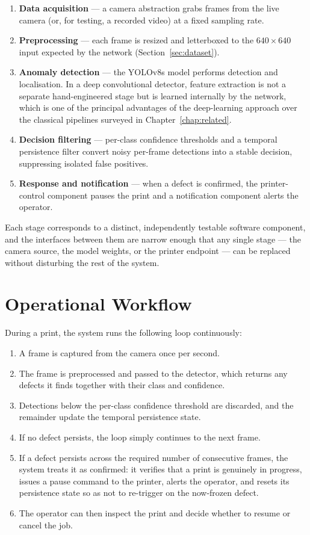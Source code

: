 \documentclass[english, Lau, oneside]{sapthesis}
\begin{document}
\begin{enumerate}
    \item \textbf{Data acquisition} --- a camera abstraction grabs frames from the live camera (or, for testing, a recorded video) at a fixed sampling rate.
    \item \textbf{Preprocessing} --- each frame is resized and letterboxed to the $640 \times 640$ input expected by the network (Section~\ref{sec:dataset}).
    \item \textbf{Anomaly detection} --- the YOLOv8s model performs detection and localisation. In a deep convolutional detector, feature extraction is not a separate hand-engineered stage but is learned internally by the network, which is one of the principal advantages of the deep-learning approach over the classical pipelines surveyed in Chapter~\ref{chap:related}.
    \item \textbf{Decision filtering} --- per-class confidence thresholds and a temporal persistence filter convert noisy per-frame detections into a stable decision, suppressing isolated false positives.
    \item \textbf{Response and notification} --- when a defect is confirmed, the printer-control component pauses the print and a notification component alerts the operator.
\end{enumerate}

Each stage corresponds to a distinct, independently testable software component, and the interfaces between them are narrow enough that any single stage --- the camera source, the model weights, or the printer endpoint --- can be replaced without disturbing the rest of the system.

\section{Operational Workflow}
During a print, the system runs the following loop continuously:

\begin{enumerate}
    \item A frame is captured from the camera once per second.
    \item The frame is preprocessed and passed to the detector, which returns any defects it finds together with their class and confidence.
    \item Detections below the per-class confidence threshold are discarded, and the remainder update the temporal persistence state.
    \item If no defect persists, the loop simply continues to the next frame.
    \item If a defect persists across the required number of consecutive frames, the system treats it as confirmed: it verifies that a print is genuinely in progress, issues a pause command to the printer, alerts the operator, and resets its persistence state so as not to re-trigger on the now-frozen defect.
    \item The operator can then inspect the print and decide whether to resume or cancel the job.
\end{enumerate}
\end{document}
